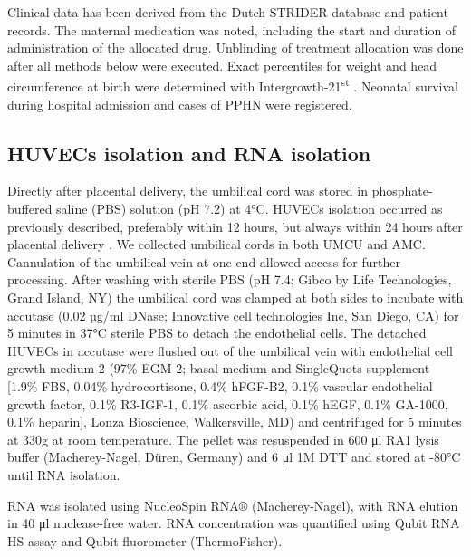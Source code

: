 \documentclass[authordate, empirical]{jote-new-article}
\begin{document}
	Clinical data has been derived from the Dutch STRIDER database and patient records. The maternal medication was noted, including the start and duration of administration of the allocated drug. Unblinding of treatment allocation was done after all methods below were executed. Exact percentiles for weight and head circumference at birth were determined with Intergrowth-21\textsuperscript{st }\parencites{Anderson2016}. Neonatal survival during hospital admission and cases of PPHN were registered.







	\subsection{HUVECs isolation and RNA isolation }



	Directly after placental delivery, the umbilical cord was stored in phosphate-buffered saline (PBS) solution (pH 7.2) at 4°C. HUVECs isolation occurred as previously described, preferably within 12 hours, but always within 24 hours after placental delivery \parencites{Hartman2020}. We collected umbilical cords in both UMCU and AMC. Cannulation of the umbilical vein at one end allowed access for further processing. After washing with sterile PBS (pH 7.4; Gibco by Life Technologies, Grand Island, NY) the umbilical cord was clamped at both sides to incubate with accutase (0.02 µg/ml DNase; Innovative cell technologies Inc, San Diego, CA) for 5 minutes in 37°C sterile PBS to detach the endothelial cells. The detached HUVECs in accutase were flushed out of the umbilical vein with endothelial cell growth medium-2 (97\% EGM-2; basal medium and SingleQuots supplement [1.9\% FBS, 0.04\% hydrocortisone, 0.4\% hFGF-B2, 0.1\% vascular endothelial growth factor, 0.1\% R3-IGF-1, 0.1\% ascorbic acid, 0.1\% hEGF, 0.1\% GA-1000, 0.1\% heparin], Lonza Bioscience, Walkersville, MD) and centrifuged for 5 minutes at 330g at room temperature. The pellet was resuspended in 600 μl RA1 lysis buffer (Macherey-Nagel, Düren, Germany) and 6 μl 1M DTT and stored at -80°C until RNA isolation.



	 RNA was isolated using NucleoSpin RNA® (Macherey-Nagel), with RNA elution in 40 μl nuclease-free water. RNA concentration was quantified using Qubit RNA HS assay and Qubit fluorometer (ThermoFisher).
\end{document}
